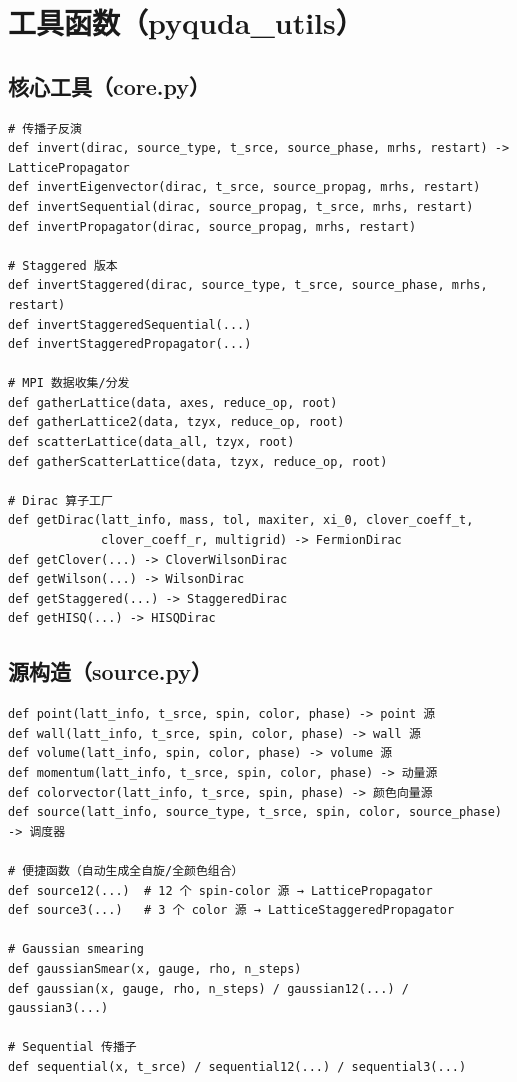 \documentclass[12pt,a4paper]{ctexart}
\begin{document}
\section{工具函数（pyquda\_utils）}

\subsection{核心工具（core.py）}

\begin{lstlisting}[style=pycode]
# 传播子反演
def invert(dirac, source_type, t_srce, source_phase, mrhs, restart) -> LatticePropagator
def invertEigenvector(dirac, t_srce, source_propag, mrhs, restart)
def invertSequential(dirac, source_propag, t_srce, mrhs, restart)
def invertPropagator(dirac, source_propag, mrhs, restart)

# Staggered 版本
def invertStaggered(dirac, source_type, t_srce, source_phase, mrhs, restart)
def invertStaggeredSequential(...)
def invertStaggeredPropagator(...)

# MPI 数据收集/分发
def gatherLattice(data, axes, reduce_op, root)
def gatherLattice2(data, tzyx, reduce_op, root)
def scatterLattice(data_all, tzyx, root)
def gatherScatterLattice(data, tzyx, reduce_op, root)

# Dirac 算子工厂
def getDirac(latt_info, mass, tol, maxiter, xi_0, clover_coeff_t,
             clover_coeff_r, multigrid) -> FermionDirac
def getClover(...) -> CloverWilsonDirac
def getWilson(...) -> WilsonDirac
def getStaggered(...) -> StaggeredDirac
def getHISQ(...) -> HISQDirac
\end{lstlisting}

\subsection{源构造（source.py）}

\begin{lstlisting}[style=pycode]
def point(latt_info, t_srce, spin, color, phase) -> point 源
def wall(latt_info, t_srce, spin, color, phase) -> wall 源
def volume(latt_info, spin, color, phase) -> volume 源
def momentum(latt_info, t_srce, spin, color, phase) -> 动量源
def colorvector(latt_info, t_srce, spin, phase) -> 颜色向量源
def source(latt_info, source_type, t_srce, spin, color, source_phase) -> 调度器

# 便捷函数（自动生成全自旋/全颜色组合）
def source12(...)  # 12 个 spin-color 源 → LatticePropagator
def source3(...)   # 3 个 color 源 → LatticeStaggeredPropagator

# Gaussian smearing
def gaussianSmear(x, gauge, rho, n_steps)
def gaussian(x, gauge, rho, n_steps) / gaussian12(...) / gaussian3(...)

# Sequential 传播子
def sequential(x, t_srce) / sequential12(...) / sequential3(...)
\end{lstlisting}
\end{document}
